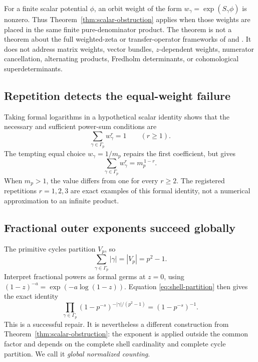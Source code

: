 \documentclass[11pt]{article}
\theoremstyle{definition}
\theoremstyle{remark}
\begin{document}
For a finite scalar potential \(\phi\), an orbit weight of the form
\(w_\gamma=\exp(S_\gamma\phi)\) is nonzero.  Thus
Theorem~\ref{thm:scalar-obstruction} applies when those weights are placed in
the same finite pure-denominator product.  The theorem is not a theorem
about the full weighted-zeta or transfer-operator frameworks of
\citet{Ruelle1976} and \citet{ParryPollicott1990}.  It does not address
matrix weights, vector bundles, \(z\)-dependent weights, numerator
cancellation, alternating products, Fredholm determinants, or cohomological
superdeterminants.

\subsection{Repetition detects the equal-weight failure}

Taking formal logarithms in a hypothetical scalar identity shows that the
necessary and sufficient power-sum conditions are
\begin{equation}
  \sum_{\gamma\in\Gamma_p}w_\gamma^r=1
  \qquad (r\ge1).
  \label{eq:power-sum-condition}
\end{equation}
The tempting equal choice \(w_\gamma=1/m_p\) repairs the first coefficient,
but gives
\begin{equation}
  \sum_{\gamma\in\Gamma_p}w_\gamma^r
  =m_p^{\,1-r}.
  \label{eq:equal-weight-sums}
\end{equation}
When \(m_p>1\), the value differs from one for every \(r\ge2\).  The
registered repetitions \(r=1,2,3\) are exact examples of this formal
identity, not a numerical approximation to an infinite product.

\subsection{Fractional outer exponents succeed globally}

The primitive cycles partition \(V_p\), so
\begin{equation}
  \sum_{\gamma\in\Gamma_p}|\gamma|=|V_p|=p^2-1.
  \label{eq:shell-partition}
\end{equation}
Interpret fractional powers as formal germs at \(z=0\), using
\((1-z)^{-a}=\exp(-a\log(1-z))\).  Equation
\eqref{eq:shell-partition} then gives the exact identity
\begin{equation}
  \prod_{\gamma\in\Gamma_p}
    (1-p^{-s})^{-|\gamma|/(p^2-1)}
  =(1-p^{-s})^{-1}.
  \label{eq:fractional-prime-identity}
\end{equation}
This is a successful repair.  It is nevertheless a different construction
from Theorem~\ref{thm:scalar-obstruction}: the exponent is applied outside
the common factor and depends on the complete shell cardinality and complete
cycle partition.  We call it \emph{global normalized counting}.
\end{document}
